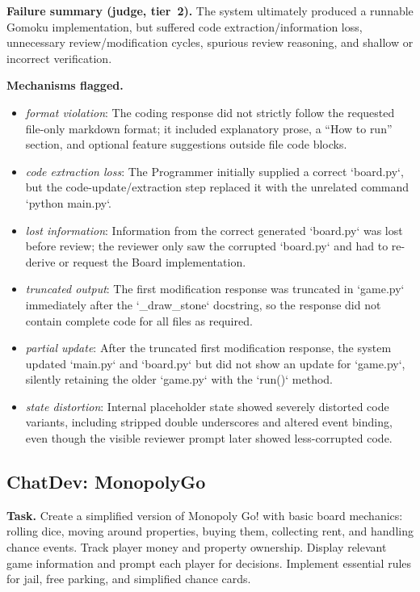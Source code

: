 \textbf{Failure summary (judge, tier~2).} The system ultimately produced a runnable Gomoku implementation, but suffered code extraction/information loss, unnecessary review/modification cycles, spurious review reasoning, and shallow or incorrect verification.

\textbf{Mechanisms flagged.}
\begin{itemize}
  \item \emph{format violation}: The coding response did not strictly follow the requested file-only markdown format; it included explanatory prose, a ``How to run'' section, and optional feature suggestions outside file code blocks.
  \item \emph{code extraction loss}: The Programmer initially supplied a correct `board.py`, but the code-update/extraction step replaced it with the unrelated command `python main.py`.
  \item \emph{lost information}: Information from the correct generated `board.py` was lost before review; the reviewer only saw the corrupted `board.py` and had to re-derive or request the Board implementation.
  \item \emph{truncated output}: The first modification response was truncated in `game.py` immediately after the `\_draw\_stone` docstring, so the response did not contain complete code for all files as required.
  \item \emph{partial update}: After the truncated first modification response, the system updated `main.py` and `board.py` but did not show an update for `game.py`, silently retaining the older `game.py` with the `run()` method.
  \item \emph{state distortion}: Internal placeholder state showed severely distorted code variants, including stripped double underscores and altered event binding, even though the visible reviewer prompt later showed less-corrupted code.
\end{itemize}

\subsection*{ChatDev: MonopolyGo}
\textbf{Task.} Create a simplified version of Monopoly Go! with basic board mechanics: rolling dice, moving around properties, buying them, collecting rent, and handling chance events. Track player money and property ownership. Display relevant game information and prompt each player for decisions. Implement essential rules for jail, free parking, and simplified chance cards.

